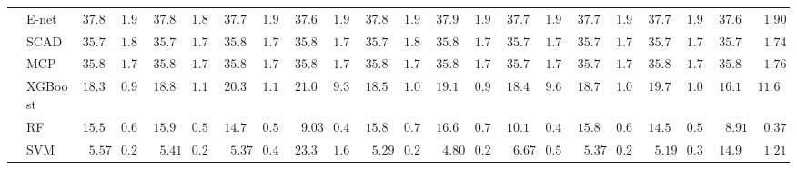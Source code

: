 \begin{tabular}{p{0.2cm}p{1cm}|p{0.6cm}p{0.6cm}|p{0.6cm}p{0.6cm}p{0.6cm}p{0.6cm}p{0.6cm}p{0.6cm}|p{0.6cm}p{0.6cm}p{0.6cm}p{0.6cm}p{0.6cm}p{0.6cm}|p{0.6cm}p{0.6cm}p{0.6cm}p{0.6cm}p{0.6cm}p{0.6cm}}
 & E-net  & $37.82$ & $1.92$ & $37.82$ & $1.88$ & $37.74$ & $1.92$ & $37.60$ & $1.92$ & $37.85$ & $1.95$ & $37.96$ & $1.93$ & $37.70$ & $1.97$ & $37.79$ & $1.93$ & $37.79$ & $1.91$ & $37.60$ & $\phantom{0}1.90$ \\
 & SCAD  & $35.76$ & $1.80$ & $35.79$ & $1.77$ & $35.83$ & $1.75$ & $35.88$ & $1.71$ & $35.76$ & $1.80$ & $35.81$ & $1.73$ & $35.73$ & $1.72$ & $35.78$ & $1.77$ & $35.79$ & $1.77$ & $35.78$ & $\phantom{0}1.74$ \\
 & MCP  & $35.80$ & $1.77$ & $35.83$ & $1.76$ & $35.84$ & $1.76$ & $35.88$ & $1.72$ & $35.82$ & $1.76$ & $35.85$ & $1.70$ & $35.76$ & $1.72$ & $35.79$ & $1.78$ & $35.82$ & $1.76$ & $35.80$ & $\phantom{0}1.76$ \\
 & XGBoost  & $18.39$ & $0.92$ & $18.87$ & $1.10$ & $20.32$ & $1.10$ & $21.07$ & $9.31$ & $18.54$ & $1.08$ & $19.18$ & $0.99$ & $18.46$ & $9.67$ & $18.76$ & $1.03$ & $19.70$ & $1.07$ & $16.19$ & $11.69$ \\
 & RF  & $15.56$ & $0.64$ & $15.98$ & $0.59$ & $14.74$ & $0.58$ & $\phantom{0}9.03$ & $0.41$ & $15.81$ & $0.73$ & $16.68$ & $0.70$ & $10.18$ & $0.48$ & $15.84$ & $0.60$ & $14.51$ & $0.53$ & $\phantom{0}8.91$ & $\phantom{0}0.37$ \\
 & SVM  & $\phantom{0}5.57$ & $0.25$ & $\phantom{0}5.41$ & $0.24$ & $\phantom{0}5.37$ & $0.43$ & $23.34$ & $1.62$ & $\phantom{0}5.29$ & $0.24$ & $\phantom{0}4.80$ & $0.22$ & $\phantom{0}6.67$ & $0.53$ & $\phantom{0}5.37$ & $0.27$ & $\phantom{0}5.19$ & $0.33$ & $14.98$ & $\phantom{0}1.21$ \\
\hline 
\end{tabular}

